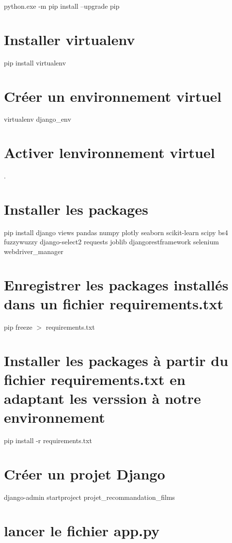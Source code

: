 python.\+exe -\/m pip install --upgrade pip

\section*{Installer virtualenv}

pip install virtualenv

\section*{Créer un environnement virtuel}

virtualenv django\+\_\+env

\section*{Activer l\textquotesingle{}environnement virtuel}

.

\section*{Installer les packages}

pip install django views pandas numpy plotly seaborn scikit-\/learn scipy bs4 fuzzywuzzy django-\/select2 requests joblib djangorestframework selenium webdriver\+\_\+manager

\section*{Enregistrer les packages installés dans un fichier requirements.\+txt}

pip freeze $>$ requirements.\+txt

\section*{Installer les packages à partir du fichier requirements.\+txt en adaptant les verssion à notre environnement}

pip install -\/r requirements.\+txt

\section*{Créer un projet Django}

django-\/admin startproject projet\+\_\+recommandation\+\_\+films

\section*{lancer le fichier app.\+py}

